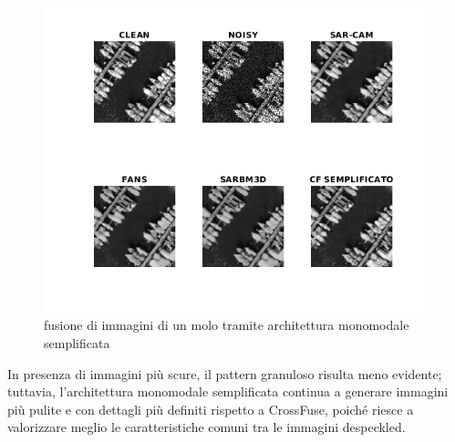 \begin{figure}[H] 
  \centering
  \includegraphics[width=1.0\textwidth]{utils/CFLharbor03.png}
  \caption{fusione di immagini di un molo tramite architettura monomodale semplificata}
  \label{fig:harbor03CFL}
\end{figure}In presenza di immagini più scure, il pattern granuloso risulta meno evidente; 
tuttavia, l’architettura monomodale semplificata continua a generare immagini più pulite e
 con dettagli più definiti rispetto a CrossFuse, poiché riesce a valorizzare meglio le 
 caratteristiche comuni tra le immagini despeckled.